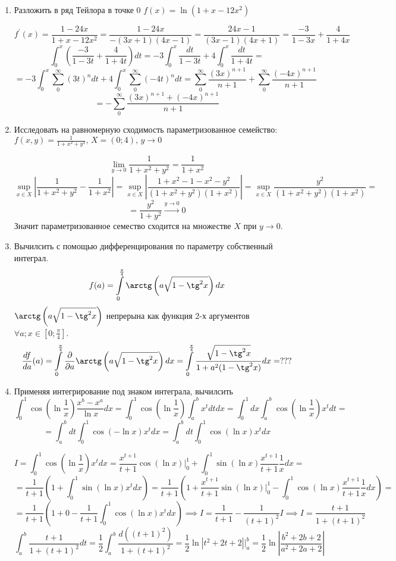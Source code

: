 \documentclass{article}
\begin{document}
\begin{large}
\begin{enumerate}
\item Разложить в ряд Тейлора в точке 0 $f(x) = \ln(1+x-12x^2)$

$$ f^{'}(x) = \frac{1-24x}{1+x-12x^2} = \frac{1-24x}{-(3x+1)(4x-1)} = \frac{24x-1}{(3x-1)(4x+1)} = \frac{-3}{1-3x}+\frac{4}{1+4x}$$
$$ \int_{0}^{x} \left( \frac{-3}{1-3t}+\frac{4}{1+4t} \right) dt = -3 \int_{0}^{x} \frac{dt}{1-3t} + 4 \int_{0}^{x} \frac{dt}{1+4t} = $$
$$ = -3 \int_{0}^{x} \sum_{0}^{\infty} (3t)^n dt + 4 \int_{0}^{x} \sum_{0}^{\infty} (-4t)^n dt = \sum_{0}^{\infty} \frac{(3x)^{n+1}}{n+1} + \sum_{0}^{\infty} \frac{(-4x)^{n+1}}{n+1} $$
$$ = -\sum_{0}^{\infty} \frac{(3x)^{n+1} + (-4x)^{n+1}}{n+1} $$

\item Исследовать на равномерную сходимость параметризованное семейство: \\ $f(x,y) = \frac{1}{1+x^2+y^2}, \, X = (0;4), \, y \to 0 $

$$ \lim_{y \to 0} \frac{1}{1+x^2+y^2} = \frac{1}{1 + x^2} $$
$$ \sup_{x \in X} \left| \frac{1}{1+x^2+y^2} - \frac{1}{1 + x^2} \right| = \sup_{x \in X} \left| \frac{1+x^2 - 1 - x^2-y^2}{(1+x^2+y^2)(1+x^2)}  \right| = \sup_{x \in X} \frac{y^2}{(1+x^2+y^2)(1+x^2)} = $$
$$ = \frac{y^2}{1+y^2} \xrightarrow{y \to 0} 0 $$
Значит параметризованное семество сходится на множестве $X$ при $y \to 0$.

\item Вычилсить с помощью дифференцирования по параметру собственный интеграл. 
$$ f(a) = \int\limits_0^{\frac{\pi}{4}} \arctg \left( a \sqrt{1-\tg^2x} \right)dx $$
$ \arctg \left( a \sqrt{1-\tg^2x} \right) $ непрерына как функция 2-х аргументов $\forall a; x\in [0;\frac{\pi}{4}]$.
$$\frac{df}{da}(a) = \int\limits_0^{\frac{\pi}{4}} \frac{\partial}{\partial a} \arctg \left( a \sqrt{1-\tg^2x} \right)dx = \int\limits_0^{\frac{\pi}{4}} \frac{\sqrt{1-\tg^2x}}{1 + a^2(1-\tg^2x)}  dx = ??? $$

\item Применяя интегрирование под знаком интеграла, вычилсить 
$$ \int_0^1 \cos \left( \ln \frac{1}{x} \right) \frac{x^b - x^a}{\ln x} dx = \int_0^1 \cos \left( \ln \frac{1}{x} \right) \int_a^b x^t dt dx = \int_0^1 dx \int_a^b \cos \left( \ln \frac{1}{x} \right) x^t dt = $$
$$ =  \int_a^b dt \int_0^1 \cos \left( -\ln x \right) x^t dx = \int_a^b dt \int_0^1 \cos \left( \ln x \right) x^t dx $$


$$ I = \int_0^1 \cos \left( \ln \frac{1}{x} \right) x^t dx = \frac{x^{t+1}}{t+1} \cos (\ln x) \Big| _0^1 + \int_0^1 \sin \left( \ln x \right) \frac{x^{t+1}}{t+1} \frac{1}{x} dx = $$ 
$$ = \frac{1}{t+1} \left(1+ \int_0^1 \sin \left( \ln x \right) x^t dx \right) = \frac{1}{t+1} \left(1+ \frac{x^{t+1}}{t+1} \sin (\ln x) \Big|_0^1 - \int_0^1 \cos \left( \ln x \right) \frac{x^{t+1}}{t+1} \frac{1}{x} dx \right) = $$
$$ = \frac{1}{t+1} \left( 1 + 0 - \frac{1}{t+1} \int_0^1 \cos \left( \ln x \right) x^t dx \right) \implies I = \frac{1}{t+1} - \frac{1}{(t+1)^2}I \implies I = \frac{t+1}{1+(t+1)^2} $$
$$ \int_a^b \frac{t+1}{1+(t+1)^2} dt = \frac{1}{2}\int_a^b \frac{d((t+1)^2)}{1+(t+1)^2} = \frac{1}{2} \ln \left| t^2+2t+2 \right| \Big|_a^b = \frac{1}{2} \ln \left| \frac{b^2+2b+2}{a^2+2a+2} \right| $$


\end{enumerate}
\end{large}
\end{document}
